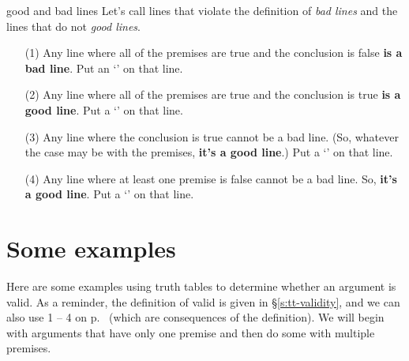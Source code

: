 \begin{factboxy}{good and bad lines}\label{s:tt-good-lines}
Let's call lines that violate the definition of  \textit{bad lines} and the lines that do not \textit{good lines}.
	\begin{enumerate}
		\item[(1)] Any line where all of the premises are true and the conclusion is false \textbf{is a bad line}. Put an `\xm' on that line.
		\item[(2)] Any line where all of the premises are true and the conclusion is true \textbf{is a good line}. Put a `\cm' on that line.
		\item[(3)] Any line where the conclusion is true cannot be a bad line. (So, whatever the case may be with the premises, \textbf{it's a good line}.) Put a `\cm' on that line.
		\item[(4)] Any line where at least one premise is false cannot be a bad line. So, \textbf{it's a good line}. Put a `\cm' on that line.
	\end{enumerate}
\end{factboxy}


\section{Some examples}

Here are some examples using truth tables to determine whether an argument is valid. As a reminder, the definition of valid is given in \S\ref{s:tt-validity}, and we can also use 1 -- 4 on p.~\pageref{s:tt-good-lines} (which are consequences of the definition). We will begin with arguments that have only one premise and then do some with multiple premises.

